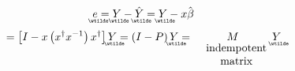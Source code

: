 \documentclass{article}
\begin{document}
\begin{equation*}
\underaccent{\wtilde}{e}%
=%
\underaccent{\wtilde}{Y}%
-%
\underaccent{\wtilde}{\hat{Y}}%
=%
\underaccent{\wtilde}{Y}%
-x\hat{\beta}
\end{equation*}%
\begin{equation*}
=\left[ I-x\left( x^{\dagger }x^{-1}\right) x^{\dagger }\right] 
\underaccent{\wtilde}{Y}%
=\left( I-P\right) 
\underaccent{\wtilde}{Y}%
=\underset{%
\begin{array}{c}
\text{indempotent} \\ 
\text{matrix}%
\end{array}%
}{M}%
\underaccent{\wtilde}{Y}%
\end{equation*}

\bigskip
\end{document}
